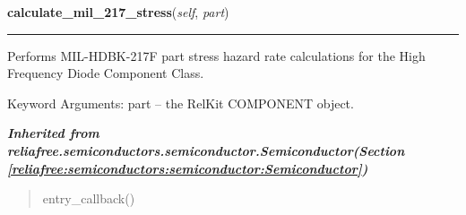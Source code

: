     \vspace{0.5ex}

\hspace{.8\funcindent}\begin{boxedminipage}{\funcwidth}

    \raggedright \textbf{calculate\_mil\_217\_stress}(\textit{self}, \textit{part})

    \vspace{-1.5ex}

    \rule{\textwidth}{0.5\fboxrule}
\setlength{\parskip}{2ex}
    Performs MIL-HDBK-217F part stress hazard rate calculations for the 
    High Frequency Diode Component Class.

    Keyword Arguments: part -- the RelKit COMPONENT object.

\setlength{\parskip}{1ex}
    \end{boxedminipage}


\large{\textbf{\textit{Inherited from reliafree.semiconductors.semiconductor.Semiconductor\textit{(Section \ref{reliafree:semiconductors:semiconductor:Semiconductor})}}}}

\begin{quote}
entry\_callback()
\end{quote}
